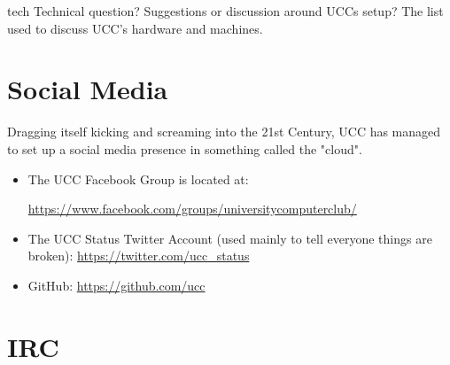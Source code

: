 \begin{ucclist}{tech}
Technical question? Suggestions or discussion around UCCs setup? 
The list used to discuss UCC's hardware and machines. 
\end{ucclist}

\section{Social Media}

\begin{mdframed}

Dragging itself kicking and screaming into the 21st Century, UCC has managed to set up a social media presence in something called the "cloud".

\begin{itemize}
\item The UCC Facebook Group is located at: 

\url{https://www.facebook.com/groups/universitycomputerclub/}
\item The UCC Status Twitter Account (used mainly to tell everyone things are broken): \url{https://twitter.com/ucc_status}
\item GitHub: \url{https://github.com/ucc}

\end{itemize}

\pagebreak



\end{mdframed}

\section{IRC}


